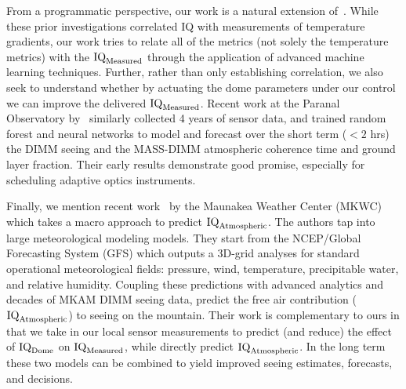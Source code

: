 
From a programmatic perspective, our work is a natural extension of~\cite{racine1984, racine1991mirror,salmon2009cfht, racine2018}. While these prior investigations correlated IQ with measurements of temperature gradients, our work tries to relate all of the metrics (not solely the temperature metrics) with the $\textrm{IQ}_{\textrm{Measured}}$ through the application of advanced machine learning techniques. Further, rather than only establishing correlation, we also seek to understand whether by actuating the dome parameters under our control we can improve the delivered $\textrm{IQ}_{\textrm{Measured}}$. Recent work at the Paranal Observatory by~\cite{milli2019nowcasting_paramal} similarly collected 4 years of sensor data, and trained random forest and neural networks to model and forecast over the short term ($<2$ hrs) the DIMM seeing and the MASS-DIMM atmospheric coherence time and ground layer fraction. Their early results demonstrate good promise, especially for scheduling adaptive optics instruments.


Finally, we mention recent work~\citep{lyman2020} by the Maunakea Weather Center (MKWC) which takes a macro approach to predict $\textrm{IQ}_{\textrm{Atmospheric}}$.  The authors tap into large meteorological modeling models.  They start from the NCEP/Global Forecasting System (GFS) which outputs a 3D-grid analyses for standard operational meteorological fields: pressure, wind, temperature, precipitable water, and relative humidity.  Coupling these predictions with advanced analytics and decades of  MKAM DIMM seeing data, \cite{lyman2020} predict the free air contribution ($\textrm{IQ}_{\textrm{Atmospheric}}$) to seeing on the mountain.  Their work is complementary to ours in that we take in our local sensor measurements to predict (and reduce) the effect of $\textrm{IQ}_{\textrm{Dome}}$ on $\textrm{IQ}_{\textrm{Measured}}$, while \cite{lyman2020} directly predict $\textrm{IQ}_{\textrm{Atmospheric}}$. In the long term these two models can be combined to yield improved seeing estimates, forecasts, and decisions.


